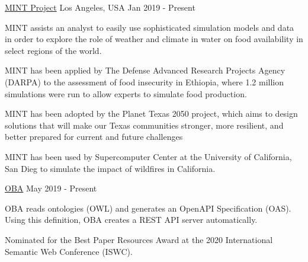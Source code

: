 \begin{cventries}
   {\href{https://mintproject.readthedocs.io/en/stable/}{MINT Project}}
  {Los Angeles, USA} {Jan 2019 - Present} { \begin{cvitems}\item {MINT assists an analyst to easily use sophisticated simulation models and data in order to explore the role of weather and climate in water on food availability in select regions of the world.} \item {MINT has been applied by The Defense Advanced Research Projects Agency (DARPA) to the assessment of food insecurity in Ethiopia, where 1.2 million simulations were run to allow experts to simulate food production.} \item {MINT has been adopted by the Planet Texas 2050 project, which aims to design solutions that will make our Texas communities stronger, more resilient, and better prepared for current and future challenges} \item {MINT has been used by Supercomputer Center at the University of California, San Dieg to simulate the impact of wildfires in California.}\end{cvitems} }

  {\href{https://github.com/KnowledgeCaptureAndDiscovery/OBA}{OBA}} {}
  {May 2019 - Present}
  { \begin{cvitems}\item {OBA reads ontologies (OWL) and generates an OpenAPI Specification (OAS). Using this definition, OBA creates a REST API server automatically.} \item {Nominated for the Best Paper Resources Award at the 2020 International Semantic Web Conference (ISWC).}\end{cvitems} }
\end{cventries}